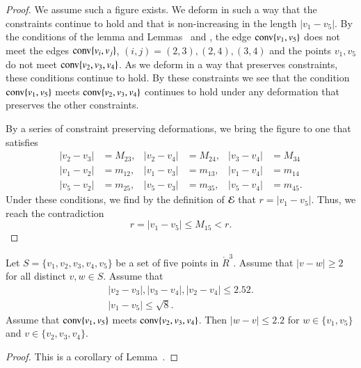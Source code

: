 \begin{proof}
We assume such a figure exists.  We deform in such a way that the constraints continue
to hold and that is non-increasing in the length $|v_1-v_5|$.  By the conditions of the
lemma and Lemmas~ and , 
the edge ${\operatorname{conv}}\{v_1,v_5\}$
does not meet the
 edges ${\operatorname{conv}}\{v_i,v_j\}$, $(i,j)=(2,3),(2,4),(3,4)$ 
and the points $v_1,v_5$
do not meet ${\operatorname{conv}}\{v_2,v_3,v_4\}$.  As we deform in a way that preserves constraints,
these conditions continue to hold.  By these constraints we see that the condition
  ${\operatorname{conv}}\{v_1,v_5\}$ meets ${\operatorname{conv}}\{v_2,v_3,v_4\}$
continues to hold under any deformation that preserves the other constraints.

By a series of constraint preserving deformations, we bring the figure to one that satisfies
	$$
	\begin{array}{rlrlrl}
	|v_2-v_3|&=M_{23}, &|v_2-v_4| &= M_{24}, &|v_3-v_4| &= M_{34}\\
	|v_1-v_2|&=m_{12}, &|v_1-v_3| &= m_{13}, &|v_1-v_4| &= m_{14}\\
	|v_5-v_2|&=m_{25}, &|v_5-v_3| &= m_{35}, &|v_5-v_4| &= m_{45}.
	\end{array}
	$$
Under these conditions, we find by the definition of ${\mathcal E}$ 
that $r = |v_1-v_5|$.  Thus, we reach the contradiction
	$$
	r = |v_1-v_5| \le M_{15} < r.
	$$
\end{proof}

\newpage

\begin{lemma} 
Let $S=\{v_1,v_2,v_3,v_4,v_5\}$ be a set of five points in $\ring{R}^3$.
Assume that $|v-w|\ge 2$ for all distinct $v,w\in S$.
Assume that
	$$
	\begin{array}{lll}
	|v_2-v_3|, |v_3-v_4|, |v_2-v_4|\le 2.52.\\
	|v_1-v_5|\le \sqrt8.
	\end{array}
	$$
Assume that ${\operatorname{conv}}\{v_1,v_5\}$ meets ${\operatorname{conv}}\{v_2,v_3,v_4\}$.
Then $|w-v|\le 2.2$ for $w\in\{v_1,v_5\}$ and $v\in\{v_2,v_3,v_4\}$.
\end{lemma}

\begin{proof}
This is a corollary of Lemma~.
\end{proof}

